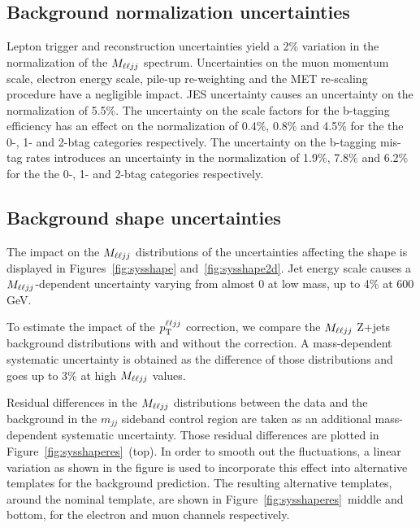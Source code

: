 \subsection{Background normalization uncertainties}

Lepton trigger and reconstruction uncertainties yield a 2\% variation in the
normalization of the $M_{\ell\ell jj}$ spectrum. Uncertainties on the muon momentum scale,
electron energy scale, pile-up re-weighting and the MET re-scaling procedure have a negligible impact. JES uncertainty 
causes an uncertainty on the normalization of 5.5\%. The uncertainty on the scale factors for the b-tagging efficiency has an effect on the normalization of 0.4\%, 0.8\% and 4.5\% for the the 0-, 1- and 2-btag categories respectively. The uncertainty on the b-tagging mis-tag rates introduces an uncertainty in the normalization of 1.9\%, 7.8\% and 6.2\% for the the 0-, 1- and 2-btag categories respectively.






\subsection{Background shape uncertainties}

The impact on the $M_{\ell\ell jj}$ distributions of the uncertainties affecting the shape is displayed in Figures~\ref{fig:sysshape} and~\ref{fig:sysshape2d}. Jet energy scale causes a $M_{\ell\ell jj}$-dependent uncertainty varying from almost 0 at low mass, up to 4\% at 600 GeV.

To estimate the impact of the $p_{\mathrm{T}}^{\ell\ell jj}$ correction, we compare the $M_{\ell\ell jj}$ Z+jets background distributions with and without the correction. A mass-dependent systematic uncertainty is obtained as the difference of those distributions and goes up to 3\% at high $M_{\ell\ell jj}$ values.

Residual differences in the $M_{\ell\ell jj}$ distributions between the data and the background in the $m_{jj}$ sideband control region are taken as an additional mass-dependent systematic uncertainty. Those residual differences are plotted in Figure~\ref{fig:sysshaperes}~(top). In order to smooth out the fluctuations, a linear variation as shown in the figure is used to incorporate this effect into alternative templates for the background prediction. The resulting alternative templates, around the nominal template, are shown in Figure~\ref{fig:sysshaperes}~middle and bottom, for the electron and muon channels respectively. 



